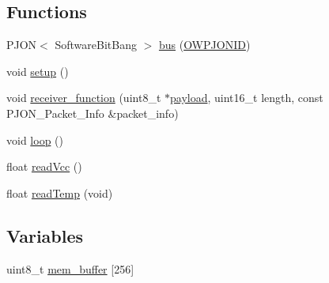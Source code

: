 \subsection*{Functions}
\begin{DoxyCompactItemize}
\item 
P\-J\-O\-N$<$ Software\-Bit\-Bang $>$ \hyperlink{OWP__DG__MicroView_8ino_a5b555b33c74db25f14ae6a0906d55596}{bus} (\hyperlink{OWP__DG__Si7021__thermo-hygrometer_8ino_aff6283040066cbe0e6d17cbcd83abffc}{O\-W\-P\-J\-O\-N\-I\-D})
\item 
void \hyperlink{OWP__DG__MicroView_8ino_a4fc01d736fe50cf5b977f755b675f11d}{setup} ()
\item 
void \hyperlink{OWP__DG__MicroView_8ino_a76fc5e73c141f748dcc1809fdcfa1714}{receiver\-\_\-function} (uint8\-\_\-t $\ast$\hyperlink{Uno__Dragino__LoRa__GPS__Shield__TTN_8ino_a78a402d1762842473567de90b11ed256}{payload}, uint16\-\_\-t length, const P\-J\-O\-N\-\_\-\-Packet\-\_\-\-Info \&packet\-\_\-info)
\item 
void \hyperlink{OWP__DG__MicroView_8ino_afe461d27b9c48d5921c00d521181f12f}{loop} ()
\item 
float \hyperlink{OWP__DG__MicroView_8ino_a0b3195c3893f02cb1b80d878b89549d6}{read\-Vcc} ()
\item 
float \hyperlink{OWP__DG__MicroView_8ino_ada109bb0cdc12131465dfe7a74f93b1e}{read\-Temp} (void)
\end{DoxyCompactItemize}
\subsection*{Variables}
\begin{DoxyCompactItemize}
\item 
uint8\-\_\-t \hyperlink{OWP__DG__MicroView_8ino_a02235b4e96743403348a58d554caa3dc}{mem\-\_\-buffer} \mbox{[}256\mbox{]}
\end{DoxyCompactItemize}


